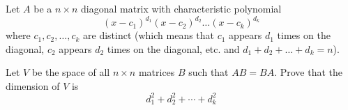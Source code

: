Let \(A\) be a \(n \times n\) diagonal matrix with characteristic polynomial
\[(x-c_1)^{d_1}(x-c_2)^{d_2}\ldots (x-c_k)^{d_k}\]
where \(c_1, c_2, \ldots, c_k\) are distinct (which means that \(c_1\) appears \(d_1\) times on the diagonal, \(c_2\) appears \(d_2\) times on the diagonal, etc. and \(d_1+d_2+\ldots + d_k=n\)).

Let \(V\) be the space of all \(n\times n\) matrices \(B\) such that \(AB=BA\).
Prove that the dimension of \(V\) is
\[d_1^2+d_2^2+\cdots + d_k^2\]